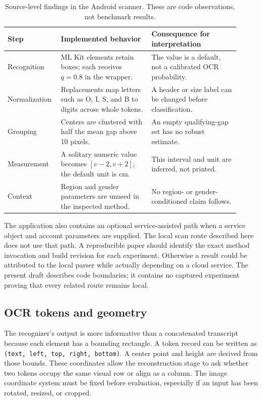 \documentclass[10pt,letterpaper]{article}
\begin{document}
\begin{table}[H]
\centering\small
\caption{Source-level findings in the Android scanner. These are code observations, not benchmark results.}
\label{tab:ocr-audit}
\begin{tabular}{@{}>{\raggedright\arraybackslash}p{0.18\linewidth}>{\raggedright\arraybackslash}p{0.37\linewidth}>{\raggedright\arraybackslash}p{0.36\linewidth}@{}}
\toprule
Step & Implemented behavior & Consequence for interpretation \\
\midrule
Recognition & ML Kit elements retain boxes; each receives $q=0.8$ in the wrapper. & The value is a default, not a calibrated OCR probability. \\
Normalization & Replacements map letters such as O, I, S, and B to digits across whole tokens. & A header or size label can be changed before classification. \\
Grouping & Centers are clustered with half the mean gap above 10 pixels. & An empty qualifying-gap set has no robust estimate. \\
Measurement & A solitary numeric value becomes $[v-2,v+2]$; the default unit is cm. & This interval and unit are inferred, not printed. \\
Context & Region and gender parameters are unused in the inspected method. & No region- or gender-conditioned claim follows. \\
\bottomrule
\end{tabular}
\end{table}


The application also contains an optional service-assisted path when a service object and account parameters are supplied. The local scan route described here does not use that path. A reproducible paper should identify the exact method invocation and build revision for each experiment. Otherwise a result could be attributed to the local parser while actually depending on a cloud service. The present draft describes code boundaries; it contains no captured experiment proving that every related route remains local.

\subsection{OCR tokens and geometry}

The recognizer's output is more informative than a concatenated transcript because each element has a bounding rectangle. A token record can be written as \texttt{(text, left, top, right, bottom)}. A center point and height are derived from those bounds. These coordinates allow the reconstruction stage to ask whether two tokens occupy the same visual row or align as a column. The image coordinate system must be fixed before evaluation, especially if an input has been rotated, resized, or cropped.
\end{document}

